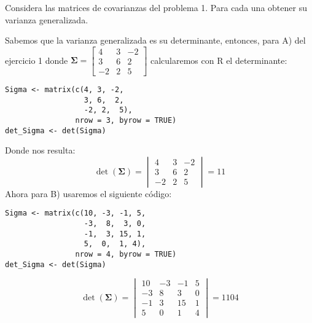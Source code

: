 \begin{problem}{6}
Considera las matrices de covarianzas del problema 1. Para cada una obtener su varianza generalizada.
\end{problem}
\begin{sol}
Sabemos que la varianza generalizada es su determinante, entonces, para A) del ejercicio 1 donde $\mathbf{\Sigma} =
\begin{bmatrix}
4&3&-2\\
3&6&2\\
-2&2&5
\end{bmatrix}$ calcularemos con R el determinante:
\begin{verbatim}
Sigma <- matrix(c(4, 3, -2,
                  3, 6,  2,
                  -2, 2,  5), 
                nrow = 3, byrow = TRUE)
det_Sigma <- det(Sigma)
\end{verbatim}
Donde nos resulta:
\[
\det(\mathbf{\Sigma}) = 
\begin{vmatrix}
4 & 3 & -2 \\
3 & 6 & 2 \\
-2 & 2 & 5
\end{vmatrix}=11
\]
Ahora para B) usaremos el siguiente código:
\begin{verbatim}
Sigma <- matrix(c(10, -3, -1, 5,
                  -3,  8,  3, 0,
                  -1,  3, 15, 1,
                  5,  0,  1, 4), 
                nrow = 4, byrow = TRUE)
det_Sigma <- det(Sigma)
\end{verbatim}

\[
\det(\mathbf{\Sigma}) = 
\begin{vmatrix}
10 & -3 & -1 & 5 \\
-3 & 8 & 3 & 0 \\
-1 & 3 & 15 & 1 \\
5 & 0 & 1 & 4
\end{vmatrix}=1104
\]
\end{sol}